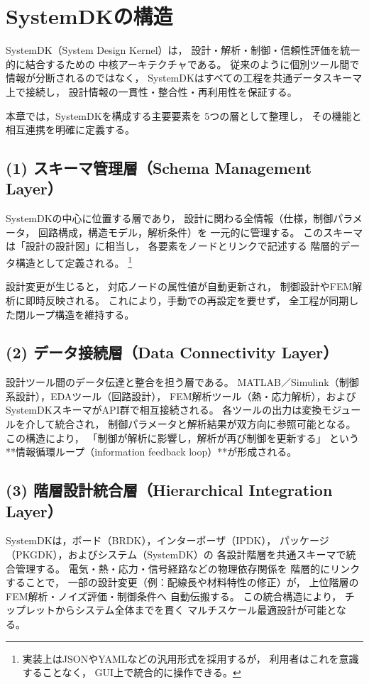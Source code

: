 \section{SystemDKの構造}

SystemDK（System Design Kernel）は，
設計・解析・制御・信頼性評価を統一的に結合するための
中核アーキテクチャである。
従来のように個別ツール間で情報が分断されるのではなく，
SystemDKはすべての工程を共通データスキーマ上で接続し，
設計情報の一貫性・整合性・再利用性を保証する。

本章では，SystemDKを構成する主要要素を
5つの層として整理し，
その機能と相互連携を明確に定義する。

\subsection{(1) スキーマ管理層（Schema Management Layer）}
SystemDKの中心に位置する層であり，
設計に関わる全情報（仕様，制御パラメータ，
回路構成，構造モデル，解析条件）を
一元的に管理する。
このスキーマは「設計の設計図」に相当し，
各要素をノードとリンクで記述する
階層的データ構造として定義される。
\footnote{実装上はJSONやYAMLなどの汎用形式を採用するが，
利用者はこれを意識することなく，
GUI上で統合的に操作できる。}

設計変更が生じると，
対応ノードの属性値が自動更新され，
制御設計やFEM解析に即時反映される。
これにより，手動での再設定を要せず，
全工程が同期した閉ループ構造を維持する。

\subsection{(2) データ接続層（Data Connectivity Layer）}
設計ツール間のデータ伝達と整合を担う層である。
MATLAB／Simulink（制御系設計），EDAツール（回路設計），
FEM解析ツール（熱・応力解析），および
SystemDKスキーマがAPI群で相互接続される。
各ツールの出力は変換モジュールを介して統合され，
制御パラメータと解析結果が双方向に参照可能となる。
この構造により，
「制御が解析に影響し，解析が再び制御を更新する」
という**情報循環ループ（information feedback loop）**が形成される。

\subsection{(3) 階層設計統合層（Hierarchical Integration Layer）}
SystemDKは，ボード（BRDK），インターポーザ（IPDK），
パッケージ（PKGDK），およびシステム（SystemDK）の
各設計階層を共通スキーマで統合管理する。
電気・熱・応力・信号経路などの物理依存関係を
階層的にリンクすることで，
一部の設計変更（例：配線長や材料特性の修正）が，
上位階層のFEM解析・ノイズ評価・制御条件へ
自動伝搬する。
この統合構造により，
チップレットからシステム全体までを貫く
マルチスケール最適設計が可能となる。

